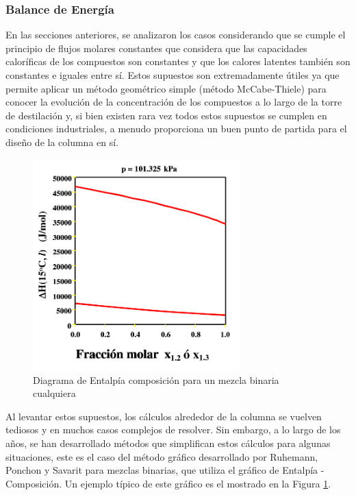 \documentclass[11pt]{book}
\begin{document}
\subsubsection{Balance de Energía}

En las secciones anteriores, se analizaron los casos considerando que se cumple el principio de flujos molares constantes que considera que las capacidades caloríficas de los compuestos son constantes y que los calores latentes también son constantes e iguales entre sí. Estos supuestos son extremadamente útiles ya que permite aplicar un método geométrico simple (método McCabe-Thiele) para conocer la evolución de la concentración de los compuestos a lo largo de la torre de destilación y, si bien existen rara vez todos estos supuestos se cumplen en condiciones industriales, a menudo proporciona un buen punto de partida para el diseño de la columna en sí. 

\begin{figure}[H]
    \centering
    \includegraphics[width = 8cm]{img/destilacion/EntalpiaComposicion.png}
    \caption{Diagrama de Entalpía composición para un mezcla binaria cualquiera}
    \label{fig:DiagramaEntalpiaComposicion}
\end{figure}

Al levantar estos supuestos, los cálculos alrededor de la columna se vuelven tediosos y en muchos casos complejos de resolver. Sin embargo, a lo largo de los años, se han desarrollado métodos que simplifican estos cálculos para algunas situaciones, este es el caso del método gráfico desarrollado por Ruhemann, Ponchon y Savarit para mezclas binarias, que utiliza el gráfico de Entalpía - Composición. Un ejemplo típico de este gráfico es el mostrado en la Figura \ref{fig:DiagramaEntalpiaComposicion}.
\end{document}

